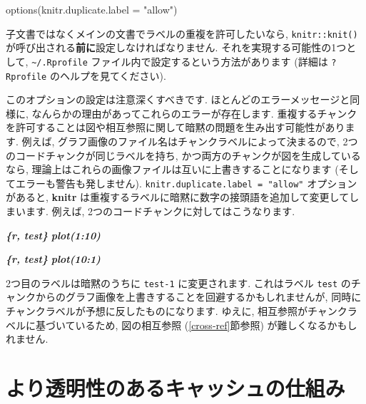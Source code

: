 \documentclass[
  11pt,
]{bxjsreport}
\newenvironment{Shaded}{\begin{snugshade}}{\end{snugshade}}
\newcommand{\AttributeTok}[1]{\textcolor[rgb]{0.77,0.63,0.00}{#1}}
\newcommand{\FunctionTok}[1]{\textcolor[rgb]{0.00,0.00,0.00}{#1}}
\newcommand{\InformationTok}[1]{\textcolor[rgb]{0.56,0.35,0.01}{\textbf{\textit{#1}}}}
\newcommand{\NormalTok}[1]{#1}
\newcommand{\StringTok}[1]{\textcolor[rgb]{0.31,0.60,0.02}{#1}}
\begin{document}
\begin{Shaded}
\begin{Highlighting}[numbers=left,,]
\FunctionTok{options}\NormalTok{(}\AttributeTok{knitr.duplicate.label =} \StringTok{"allow"}\NormalTok{)}
\end{Highlighting}
\end{Shaded}

子文書ではなくメインの文書でラベルの重複を許可したいなら, \texttt{knitr::knit()} が呼び出される\textbf{前に}設定しなければなりません. それを実現する可能性の1つとして, \texttt{\textasciitilde{}/.Rprofile} ファイル内で設定するという方法があります (詳細は \texttt{?Rprofile} のヘルプを見てください).

このオプションの設定は注意深くすべきです. ほとんどのエラーメッセージと同様に, なんらかの理由があってこれらのエラーが存在します. 重複するチャンクを許可することは図や相互参照に関して暗黙の問題を生み出す可能性があります. 例えば, グラフ画像のファイル名はチャンクラベルによって決まるので, 2つのコードチャンクが同じラベルを持ち, かつ両方のチャンクが図を生成しているなら, 理論上はこれらの画像ファイルは互いに上書きすることになります (そしてエラーも警告も発しません). \texttt{knitr.duplicate.label = "allow"} オプションがあると, \textbf{knitr} は重複するラベルに暗黙に数字の接頭語を追加して変更してしまいます. 例えば, 2つのコードチャンクに対してはこうなります.

\begin{Shaded}
\begin{Highlighting}[]
\InformationTok{\textasciigrave{}\textasciigrave{}\textasciigrave{}\{r, test\}}
\InformationTok{plot(1:10)}
\InformationTok{\textasciigrave{}\textasciigrave{}\textasciigrave{}}

\InformationTok{\textasciigrave{}\textasciigrave{}\textasciigrave{}\{r, test\}}
\InformationTok{plot(10:1)}
\InformationTok{\textasciigrave{}\textasciigrave{}\textasciigrave{}}
\end{Highlighting}
\end{Shaded}

2つ目のラベルは暗黙のうちに \texttt{test-1} に変更されます. これはラベル \texttt{test} のチャンクからのグラフ画像を上書きすることを回避するかもしれませんが, 同時にチャンクラベルが予想に反したものになります. ゆえに, 相互参照がチャンクラベルに基づいているため, 図の相互参照 (\ref{cross-ref}節参照) が難しくなるかもしれません.

\hypertarget{cache-rds}{%
\section{より透明性のあるキャッシュの仕組み}\label{cache-rds}}
\end{document}
